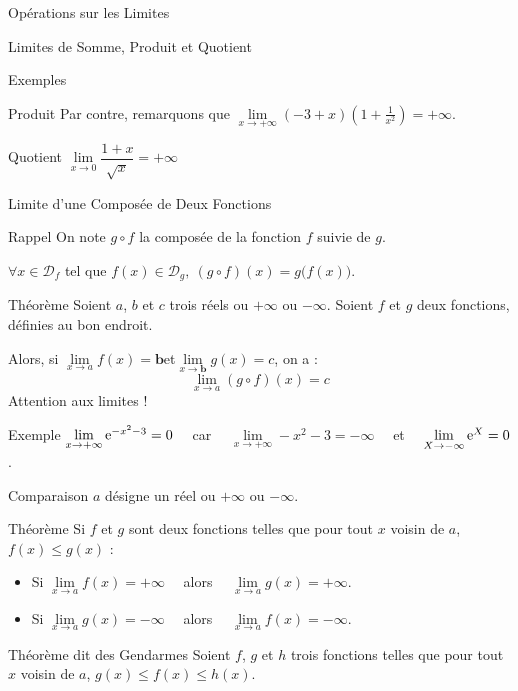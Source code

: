 \documentclass{cours}
\begin{document}
\begin{Gpartie}{Opérations sur les Limites}
\begin{Spartie}{Limites de Somme, Produit et Quotient}
\begin{SSpartie}{Exemples}
\begin{SSSpartie}{Produit}
                    Par contre, remarquons que $\lim\limits_{x\to+\infty}\left(-3+x\right)\left(1+\frac{1}{x^2}\right)=+\infty$.
                \end{SSSpartie}
                \begin{SSSpartie}{Quotient} 
                    $\lim\limits_{x\to0}\dfrac{1+x}{\sqrt{x}}=+\infty$
                \end{SSSpartie}
            \end{SSpartie}
        \end{Spartie}
        \pagebreak
        \begin{Spartie}{Limite d'une Composée de Deux Fonctions} 
            \begin{SSpartie}{Rappel} 
                On note $g\circ f$ la composée de la fonction $f$ suivie de $g$.

                $\forall x\in\mathcal{D}_f$ tel que $f(x)\in\mathcal{D}_g,~(g\circ f)(x)=g\big(f(x)\big)$.
            \end{SSpartie}
            \begin{SSpartie}{Théorème} 
                Soient $a$, $b$ et $c$ trois réels ou $+\infty$ ou $-\infty$. Soient $f$ et $g$ deux fonctions, définies au bon endroit. 
                
                Alors, si $\lim\limits_{x\to a}f(x)=\boxed{\boldsymbol{b}}$\quad et\quad$\lim\limits_{x\to\boxed{\boldsymbol{b}}}g(x)=c$, on a : \[\lim\limits_{x\to a}(g\circ f)(x)=c\]
                Attention aux limites !
            \end{SSpartie}
            \begin{SSpartie}{Exemple} 
                $\lim\limits_{x\to+\infty}\mathrm{e}^{-x^2-3}=0\quad$ car $\quad\lim\limits_{x\to+\infty}-x^2-3=-\infty\quad$ et $\quad\lim\limits_{X\to-\infty}\mathrm{e}^X=0$.
            \end{SSpartie}
        \end{Spartie}
        \begin{Spartie}{Comparaison} 
            $a$ désigne un réel ou $+\infty$ ou $-\infty$.
            \begin{SSpartie}{Théorème} 
                Si $f$ et $g$ sont deux fonctions telles que pour tout $x$ voisin de $a$, $f(x)\leq g(x)$ :
                \begin{itemize}
                    \item Si $\lim\limits_{x\to a}f(x)=+\infty\quad$ alors $\quad\lim\limits_{x\to a}g(x)=+\infty$.
                    \item Si $\lim\limits_{x\to a}g(x)=-\infty\quad$ alors $\quad\lim\limits_{x\to a}f(x)=-\infty$.
                \end{itemize}
            \end{SSpartie}
            \begin{SSpartie}{Théorème dit \og des Gendarmes \fg{}} 
                Soient $f$, $g$ et $h$ trois fonctions telles que pour tout $x$ voisin de $a$, $g(x)\leq f(x)\leq h(x)$.


\end{SSpartie}
\end{Spartie}
\end{Gpartie}
\end{document}
